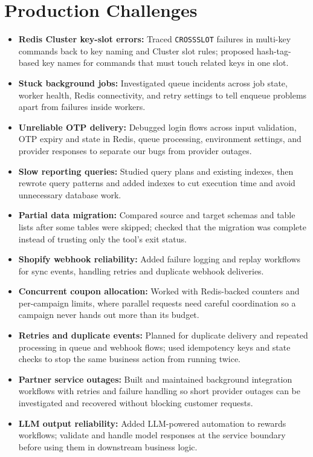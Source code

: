 \documentclass[letterpaper,10pt]{article}
\newcommand{\itemx}[1]{\item\small{#1\vspace{-2pt}}}
\begin{document}
\section{Production Challenges}
\begin{itemize}[leftmargin=.18in]
\itemx{\textbf{Redis Cluster key-slot errors:} Traced \texttt{CROSSSLOT} failures in multi-key commands back to key naming and Cluster slot rules; proposed hash-tag-based key names for commands that must touch related keys in one slot.}
\itemx{\textbf{Stuck background jobs:} Investigated queue incidents across job state, worker health, Redis connectivity, and retry settings to tell enqueue problems apart from failures inside workers.}
\itemx{\textbf{Unreliable OTP delivery:} Debugged login flows across input validation, OTP expiry and state in Redis, queue processing, environment settings, and provider responses to separate our bugs from provider outages.}
\itemx{\textbf{Slow reporting queries:} Studied query plans and existing indexes, then rewrote query patterns and added indexes to cut execution time and avoid unnecessary database work.}
\itemx{\textbf{Partial data migration:} Compared source and target schemas and table lists after some tables were skipped; checked that the migration was complete instead of trusting only the tool's exit status.}
\itemx{\textbf{Shopify webhook reliability:} Added failure logging and replay workflows for sync events, handling retries and duplicate webhook deliveries.}
\itemx{\textbf{Concurrent coupon allocation:} Worked with Redis-backed counters and per-campaign limits, where parallel requests need careful coordination so a campaign never hands out more than its budget.}
\itemx{\textbf{Retries and duplicate events:} Planned for duplicate delivery and repeated processing in queue and webhook flows; used idempotency keys and state checks to stop the same business action from running twice.}
\itemx{\textbf{Partner service outages:} Built and maintained background integration workflows with retries and failure handling so short provider outages can be investigated and recovered without blocking customer requests.}
\itemx{\textbf{LLM output reliability:} Added LLM-powered automation to rewards workflows; validate and handle model responses at the service boundary before using them in downstream business logic.}
\end{itemize}
\end{document}
